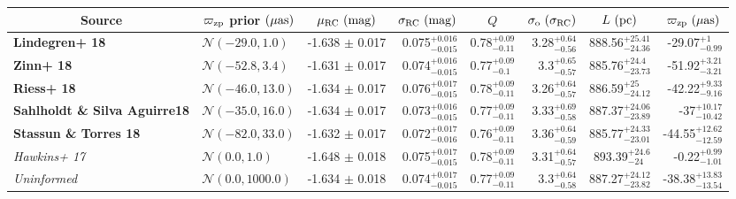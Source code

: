 \documentclass[fleqn,usenatbib]{mnras}
\begin{document}
\begin{table}
    \begin{tabular}{llrrrrrr}
    \toprule
    \multicolumn{1}{c}{Source} &  \multicolumn{1}{c}{$\varpi_{\rm zp}$ prior $(\mu \rm as)$} & \multicolumn{1}{c}{$\mu_{\rm RC}\ (\rm mag)$} & \multicolumn{1}{c}{$\sigma_{\rm RC}\ (\rm mag)$}  & \multicolumn{1}{c}{$Q$} &  \multicolumn{1}{c}{$\sigma_{\rm o}\ (\sigma_{\rm RC})$} & \multicolumn{1}{c}{$L\ (\rm pc)$} & \multicolumn{1}{c}{$\varpi_{\rm zp}\ (\mu \rm as)$} \\
    \midrule
        \textbf{Lindegren+ 18 } &                   $\mathcal{N}(-29.0 , 1.0) $  & -1.638 $\pm$ 0.017 &  0.075$_{-0.015}^{+0.016}$ &  0.78$_{-0.11}^{+0.09}  $   &  3.28$_{-0.56}^{+0.64}$ &  888.56$_{-24.36}^{+25.41} $ & -29.07$_{- 0.99 }^{+     1 }$\\
        \textbf{Zinn+ 18      } &                   $\mathcal{N}(-52.8 , 3.4) $  & -1.631 $\pm$ 0.017 &  0.074$_{-0.015}^{+0.016}$ &  0.77$_{- 0.1}^{+0.09}  $   &   3.3$_{-0.57}^{+0.65}$ &  885.76$_{-23.73}^{+ 24.4} $ & -51.92$_{- 3.21 }^{+  3.21 }$\\
        \textbf{Riess+ 18     } &                   $\mathcal{N}(-46.0 , 13.0)$  & -1.634 $\pm$ 0.017 &  0.076$_{-0.015}^{+0.017}$ &  0.78$_{-0.11}^{+0.09}  $   &  3.26$_{-0.57}^{+0.64}$ &  886.59$_{-24.12}^{+   25} $ & -42.22$_{- 9.16 }^{+  9.33 }$\\
        \textbf{Sahlholdt \& Silva Aguirre18 } &    $\mathcal{N}(-35.0 , 16.0)$  & -1.634 $\pm$ 0.017 &  0.073$_{-0.015}^{+0.016}$ &  0.77$_{-0.11}^{+0.09}  $   &  3.33$_{-0.58}^{+0.69}$ &  887.37$_{-23.89}^{+24.06} $ &    -37$_{-10.42 }^{+ 10.17 }$\\
        \textbf{Stassun \& Torres 18   } &          $\mathcal{N}(-82.0 , 33.0)$  & -1.632 $\pm$ 0.017 &  0.072$_{-0.016}^{+0.017}$ &  0.76$_{-0.11}^{+0.09}  $   &  3.36$_{-0.59}^{+0.64}$ &  885.77$_{-23.01}^{+24.33} $ & -44.55$_{-12.59 }^{+ 12.62 }$\\
        \textit{Hawkins+ 17 } &                     $\mathcal{N}(0.0 , 1.0)   $  & -1.648 $\pm$ 0.018 &  0.075$_{-0.015}^{+0.017}$ &  0.78$_{-0.11}^{+0.09}  $   &  3.31$_{-0.57}^{+0.64}$ &  893.39$_{-24   }^{+24.6 } $ &  -0.22$_{-  1.01}^{+   0.99}$ \\
        \textit{Uninformed} &                       $\mathcal{N}(0.0 , 1000.0)$  & -1.634 $\pm$ 0.018 &  0.074$_{-0.015}^{+0.017}$ &  0.77$_{-0.11}^{+0.09}  $   &   3.3$_{-0.58}^{+0.64}$ &  887.27$_{-23.82}^{+24.12} $ & -38.38$_{-13.54 }^{+ 13.83 }$\\

\end{tabular}
\end{table}
\end{document}
